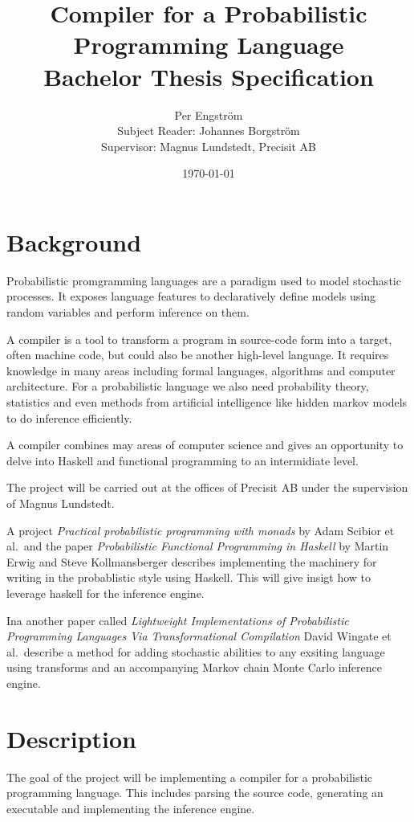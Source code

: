 \documentclass[a4paper, parskip]{scrartcl}
\title{Compiler for a Probabilistic Programming Language \todo{Title draft} \\ \normalfont
\Large Bachelor Thesis Specification}
\author{Per Engström \\ \small Subject Reader: Johannes Borgström \\ \small Supervisor:
  Magnus Lundstedt, Precisit AB}
\date{\today}
\begin{document}
\maketitle

\section{Background}
\label{sec:background}

Probabilistic promgramming languages are a paradigm used to model stochastic
processes. It exposes language features to declaratively define models using
random variables and perform inference on them.

A compiler is a tool to transform a program in source-code form into a target,
often machine code, but could also be another high-level language. It requires
knowledge in many areas including formal languages, algorithms and computer
architecture. For a probabilistic language we also need probability theory,
statistics and even methods from artificial intelligence like hidden markov
models to do inference efficiently.

A compiler combines may areas of computer science and gives an opportunity to
delve into Haskell and functional programming to an intermidiate level.

The project will be carried out at the offices of Precisit AB under the
supervision of Magnus Lundstedt.


A project \emph{Practical probabilistic programming with monads} by Adam Scibior
et al.\ and the paper \emph{Probabilistic Functional Programming in Haskell} by Martin
Erwig and Steve Kollmansberger describes implementing the machinery for writing
in the probablistic style using Haskell. This will give insigt how to leverage
haskell for the inference engine.

Ina another paper called \emph{Lightweight Implementations of Probabilistic
Programming Languages Via Transformational Compilation} David Wingate et al.\
describe a method for adding stochastic abilities to any exsiting language using
transforms and an accompanying Markov chain Monte Carlo inference engine.

\section{Description}
\label{sec:description}

The goal of the project will be implementing a compiler for a probabilistic
programming language. This includes parsing the source code, generating an
executable and implementing the inference engine.
\end{document}
